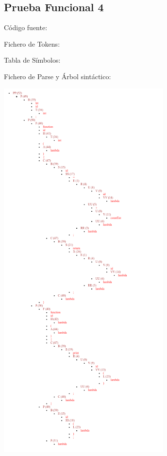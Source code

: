 \documentclass{article}[a4paper]
\begin{document}
\begin{appendices}
\subsection{Prueba Funcional 4}
Código fuente:

\hspace{\parindent} Fichero de Tokens:

\hspace{\parindent} Tabla de Símbolos:

\hspace{\parindent} Fichero de Parse y Árbol sintáctico:

\includegraphics[width=0.65\textwidth]{arbol4.png}


\end{appendices}
\end{document}
